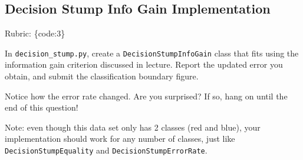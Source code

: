 \documentclass{article}
\def\rubric#1{\gre{Rubric: \{#1\}}}{}
\def\blu#1{{\color{blu}#1}}
\def\gre#1{{\color{gre}#1}}
\begin{document}
\subsection{Decision Stump Info Gain Implementation}
\rubric{code:3}

In \texttt{decision\string_stump.py}, \blu{create a \texttt{DecisionStumpInfoGain} class that 
fits using the information gain criterion discussed in lecture. Report the updated error you obtain, and submit the classification boundary figure.}

Notice how the error rate changed. Are you surprised? If so, hang on until the end of this question!

Note: even though this data set only has 2 classes (red and blue), your implementation should work 
for any number of classes, just like \texttt{DecisionStumpEquality} and \texttt{DecisionStumpErrorRate}.
\end{document}
